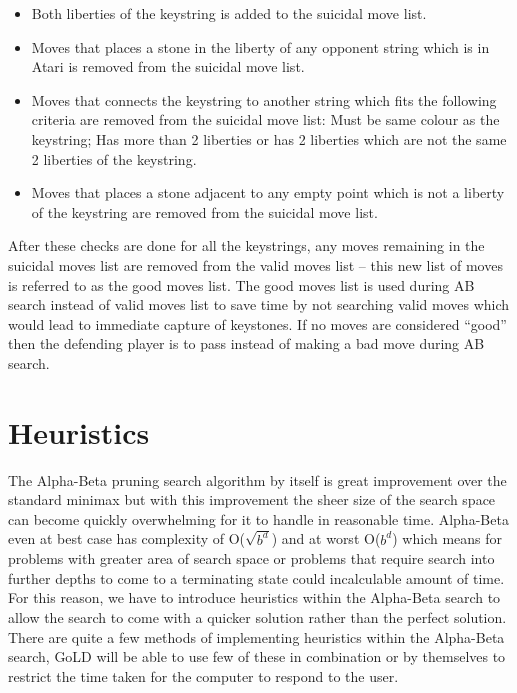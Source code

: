 \documentclass{l4proj}
\begin{document}
\begin{itemize}
	\item Both liberties of the keystring is added to the suicidal move list.
	\item Moves that places a stone in the liberty of any opponent string which is in Atari is removed from the suicidal move list.
    \item Moves that connects the keystring to another string which fits the following criteria are removed from the suicidal move list: Must be same colour as the keystring; Has more than 2 liberties or has 2 liberties which are not the same 2 liberties of the keystring.
    \item Moves that places a stone adjacent to any empty point which is not a liberty of the keystring are removed from the suicidal move list.
\end{itemize}

After these checks are done for all the keystrings, any moves remaining in the suicidal moves list are removed from the valid moves list – this new list of moves is referred to as the good moves list. The good moves list is used during AB search instead of valid moves list to save time by not searching valid moves which would lead to immediate capture of keystones. If no moves are considered “good” then the defending player is to pass instead of making a bad move during AB search.


\section{Heuristics}

The Alpha-Beta pruning search algorithm by itself is great improvement over the standard minimax but with this improvement the sheer size of the search space can become quickly overwhelming for it to handle in reasonable time. Alpha-Beta even at best case has complexity of O($\sqrt{b^d}$) and at worst O($b^d$) which means for problems with greater area of search space or problems that require search into further depths to come to a terminating state could incalculable amount of time. For this reason, we have to introduce heuristics within the Alpha-Beta search to allow the search to come with a quicker solution rather than the perfect solution. There are quite a few methods of implementing heuristics within the Alpha-Beta search, GoLD will be able to use few of these in combination or by themselves to restrict the time taken for the computer to respond to the user.
\end{document}

